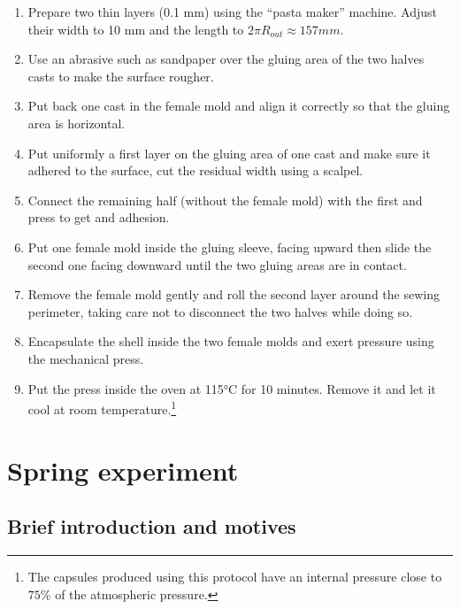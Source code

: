 \begin{enumerate}
	\item Prepare two thin layers (0.1 mm) using the "`pasta maker"' machine. Adjust their width to 10 mm and the length to $2\pi R_{out} \approx 157 mm$.
	\item Use an abrasive such as sandpaper over the gluing area of the two halves casts to make the surface rougher.
	\item Put back one cast in the female mold and align it correctly so that the gluing area is horizontal.
	\item Put uniformly a first layer on the gluing area of one cast and make sure it adhered to the surface, cut the residual width using a scalpel.
	\item Connect the remaining half (without the female mold) with the first and press to get and adhesion.
	\item Put one female mold inside the gluing sleeve, facing upward then slide the second one facing downward until the two gluing areas are in contact.
	\item Remove the female mold gently and roll the second layer around the sewing perimeter, taking care not to disconnect the two halves while doing so.
	\item Encapsulate the shell inside the two female molds and exert pressure using the mechanical press.
	\item Put the press inside the oven at 115°C for 10 minutes. Remove it and let it cool at room temperature.\footnote{The capsules produced using this protocol have an internal pressure close to $75\%$ of the atmospheric pressure.}
\end{enumerate}

\section{Spring experiment}
\subsection{Brief introduction and motives}

